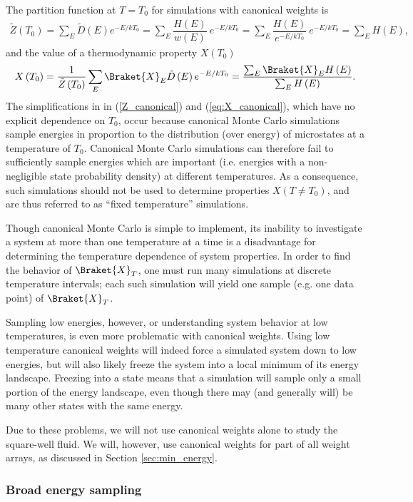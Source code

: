 \documentclass[11pt]{article}
\newcommand{\bk}{\Braket} %
\newcommand{\f}[2]{\dfrac{#1}{#2}} %
\newcommand{\p}[1]{\left(#1\right)} %
\begin{document}
The partition function at $T=T_0$ for simulations with canonical
weights is
\begin{align}
  \tilde Z\p{T_0}=\sum_E\tilde D\p{E}e^{-E/kT_0}
  =\sum_E\f{H\p{E}}{w\p{E}}~e^{-E/kT_0}
  =\sum_E\f{H\p{E}}{e^{-E/kT_0}}~e^{-E/kT_0}=\sum_EH\p{E},
  \label{Z_canonical}
\end{align}
and the value of a thermodynamic property $X\p{T_0}$
\begin{align}
  X\p{T_0}=\f1{\tilde Z\p{T_0}}\sum_E\bk{X}_E\tilde D\p{E}e^{-E/kT_0}
  =\f{\sum_E\bk{X}_EH\p{E}}{\sum_EH\p{E}}.
  \label{eq:X_canonical}
\end{align}
The simplifications in in (\ref{Z_canonical}) and
(\ref{eq:X_canonical}), which have no explicit dependence on $T_0$,
occur because canonical Monte Carlo simulations sample energies in
proportion to the distribution (over energy) of microstates at a
temperature of $T_0$.  Canonical Monte Carlo simulations can therefore
fail to sufficiently sample energies which are important
(i.e. energies with a non-negligible state probability density) at
different temperatures. As a consequence, such simulations should not
be used to determine properties $X\p{T\ne T_0}$, and are thus referred
to as ``fixed temperature'' simulations.

Though canonical Monte Carlo is simple to implement, its inability to
investigate a system at more than one temperature at a time is a
disadvantage for determining the temperature dependence of system
properties. In order to find the behavior of $\bk{X}_T$, one must run
many simulations at discrete temperature intervals; each such
simulation will yield one sample (e.g. one data point) of $\bk{X}_T$.

Sampling low energies, however, or understanding system behavior at
low temperatures, is even more problematic with canonical
weights. Using low temperature canonical weights will indeed force a
simulated system down to low energies, but will also likely freeze the
system into a local minimum of its energy landscape. Freezing into a
state means that a simulation will sample only a small portion of the
energy landscape, even though there may (and generally will) be many
other states with the same energy.

Due to these problems, we will not use canonical weights alone to
study the square-well fluid. We will, however, use canonical weights
for part of all weight arrays, as discussed in Section
\ref{sec:min_energy}.

\subsubsection{Broad energy sampling}
\label{sec:broad_energy_sampling}
\end{document}
